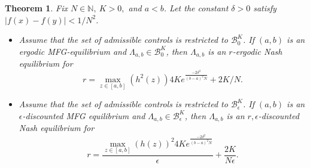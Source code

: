 \documentclass{article}
\newtheorem{theorem}[thm]{Theorem}
\begin{document}
\begin{theorem}
    Fix $N \in \mathbb{N}, \ K>0,  $ and $a < b$. Let the constant $\delta>0$ satisfy $\vert f(x)-f(y) \vert <1/N^2 $.
 \begin{itemize}
     \item[\rm{(i)}] Assume that the set of admissible controls is restricted to $\mathcal{B}^K_0$. If $(a,b)$ is an ergodic MFG-equilibrium and $\Lambda_{a,b} \in \mathcal{B}^K_0$, then $\Lambda_{a,b}$ is an $r$-ergodic Nash equilibrium for 
     $$r=\max_{z \in [a,b]}(h^2(z)) 4K e^{\frac{-2 \delta^2}{(b-a)^2N}}+2K/N .$$
     \item[\rm{(ii)}] Assume that the set of admissible controls is restricted to $\mathcal{B}^K_\epsilon$. If $(a,b)$ is an $\epsilon$-discounted MFG equilibrium and $\Lambda_{a,b} \in \mathcal{B}^K_{\epsilon}$, then $\Lambda_{a,b}$ is an $r,\epsilon$-discounted Nash equilibrium for
          $$r=\frac{\max_{z \in [a,b]}(h(z))^2 4Ke^{\frac{-2 \delta^2}{(b-a)^2N}}}{\epsilon}+\frac{2K}{N\epsilon} . $$

 \end{itemize}   
\end{theorem}
%
\end{document}
